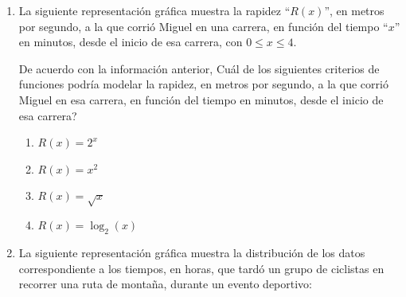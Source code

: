 \documentclass[12pt]{article}
\begin{document}
\begin{enumerate}[label=\textbf{\arabic*.}, itemsep=2.5cm]
\begin{enumerate}[label=\Alph*), itemsep=5pt]
  \item $C(x) = 2^{x} + 4$
  \item $C(x) = x^{2} + 3$
  \item $C(x) = \sqrt{x-3}$
  \item $C(x) = \log_{2}(x) + 4$
\end{enumerate}

\Needspace{0.82\textheight}
\item
La siguiente representaci\'on gr\'afica muestra la rapidez ``$R(x)$'', en metros por segundo, a la que corri\'o Miguel en una carrera, en funci\'on del tiempo ``$x$'' en minutos, desde el inicio de esa carrera, con $0 \leq x \leq 4$.

\begin{center}
\end{center}

De acuerdo con la informaci\'on anterior, \textquestiondown Cu\'al de los siguientes criterios de funciones podr\'ia modelar la rapidez, en metros por segundo, a la que corri\'o Miguel en esa carrera, en funci\'on del tiempo en minutos, desde el inicio de esa carrera?

\begin{enumerate}[label=\Alph*)]
  \item $R(x) = 2^{x}$
  \item $R(x) = x^{2}$
  \item $R(x) = \sqrt{x}$
  \item $R(x) = \log_{2}(x)$
\end{enumerate}

\Needspace{0.82\textheight}
\item
La siguiente representaci\'on gr\'afica muestra la distribuci\'on de los datos correspondiente a los tiempos, en horas, que tard\'o un grupo de ciclistas en recorrer una ruta de monta\~na, durante un evento deportivo:


\end{enumerate}
\end{document}
